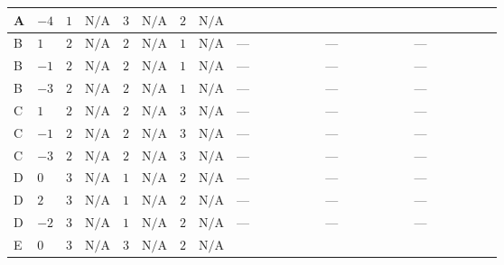 \documentclass[8pt]{article}
\begin{document}
\begin{landscape}
\begin{longtable}{@{}llcccccc >{\raggedright\arraybackslash}p{0.21\linewidth} >{\raggedright\arraybackslash}p{0.21\linewidth} >{\raggedright\arraybackslash}p{0.21\linewidth}@{}}
\midrule
A & $-4$ & $1$ & $\text{N/A}$ & $3$ & $\text{N/A}$ & $2$ & $\text{N/A}$ & \scriptsize\adjustbox{max width=\linewidth}{$\begin{gathered} -2 {g_2}^4\end{gathered}$} & \scriptsize\adjustbox{max width=\linewidth}{$\begin{gathered} +{g_1}^2 \left(8 {g_2}^2-12 {\lambda_{S_2}^{(A)}}\right)\end{gathered}$} & \scriptsize\adjustbox{max width=\linewidth}{$\begin{gathered} -24 {g_2}^2 {\lambda_{S_2}^{(A)}}\end{gathered}$} \\
\midrule
B & $1$ & $2$ & $\text{N/A}$ & $2$ & $\text{N/A}$ & $1$ & $\text{N/A}$ & --- & --- & --- \\
\midrule
B & $-1$ & $2$ & $\text{N/A}$ & $2$ & $\text{N/A}$ & $1$ & $\text{N/A}$ & --- & --- & --- \\
\midrule
B & $-3$ & $2$ & $\text{N/A}$ & $2$ & $\text{N/A}$ & $1$ & $\text{N/A}$ & --- & --- & --- \\
\midrule
C & $1$ & $2$ & $\text{N/A}$ & $2$ & $\text{N/A}$ & $3$ & $\text{N/A}$ & --- & --- & --- \\
\midrule
C & $-1$ & $2$ & $\text{N/A}$ & $2$ & $\text{N/A}$ & $3$ & $\text{N/A}$ & --- & --- & --- \\
\midrule
C & $-3$ & $2$ & $\text{N/A}$ & $2$ & $\text{N/A}$ & $3$ & $\text{N/A}$ & --- & --- & --- \\
\midrule
D & $0$ & $3$ & $\text{N/A}$ & $1$ & $\text{N/A}$ & $2$ & $\text{N/A}$ & --- & --- & --- \\
\midrule
D & $2$ & $3$ & $\text{N/A}$ & $1$ & $\text{N/A}$ & $2$ & $\text{N/A}$ & --- & --- & --- \\
\midrule
D & $-2$ & $3$ & $\text{N/A}$ & $1$ & $\text{N/A}$ & $2$ & $\text{N/A}$ & --- & --- & --- \\
\midrule
E & $0$ & $3$ & $\text{N/A}$ & $3$ & $\text{N/A}$ & $2$ & $\text{N/A}$ & \scriptsize\adjustbox{max width=\linewidth}{$\begin{gathered} -2 {g_2}^4\end{gathered}$} & \scriptsize\adjustbox{max width=\linewidth}{$\begin{gathered} +{g_1}^2 \left(8 {g_2}^2-12 {\lambda_{S_2}^{(A)}}\right)\end{gathered}$} & \scriptsize\adjustbox{max width=\linewidth}{$\begin{gathered} -24 {g_2}^2 {\lambda_{S_2}^{(A)}}\end{gathered}$} \\

\end{longtable}
\end{landscape}
\end{document}
